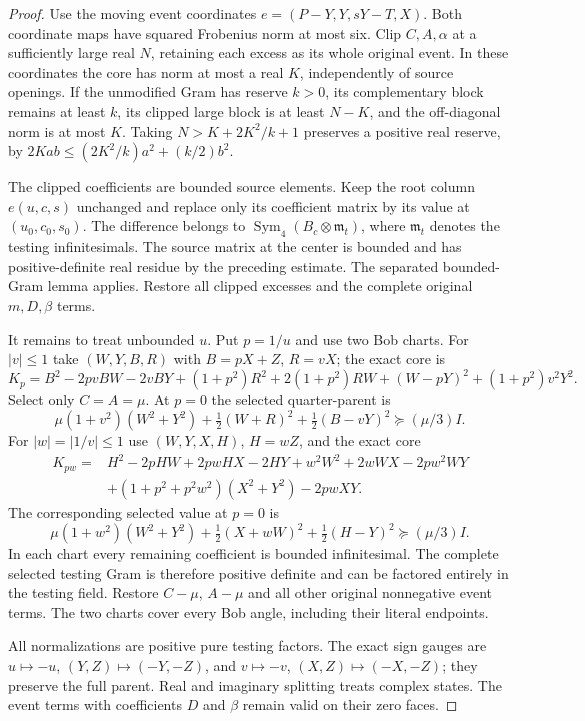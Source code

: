 \begin{proof}
Use the moving event coordinates $e=(P-Y,Y,sY-T,X)$.
Both coordinate maps have squared Frobenius norm at most six.
Clip $C,A,\alpha$ at a sufficiently large real $N$, retaining each
excess as its whole original event. In these coordinates the core
has norm at most a real $K$, independently of source openings.
If the unmodified Gram has reserve $k>0$, its complementary block
remains at least $k$, its clipped large block is at least $N-K$,
and the off-diagonal norm is at most $K$. Taking
$N>K+2K^2/k+1$ preserves a positive real reserve, by
$2Kab\le(2K^2/k)a^2+(k/2)b^2$.

The clipped coefficients are bounded source elements. Keep the root
column $e(u,c,s)$ unchanged and replace only its coefficient matrix
by its value at $(u_0,c_0,s_0)$. The difference belongs to
$\operatorname{Sym}_4(B_c\otimes\mathfrak m_t)$, where
$\mathfrak m_t$ denotes the testing infinitesimals. The source
matrix at the center is bounded and has positive-definite real
residue by the preceding estimate.
The separated bounded-Gram lemma applies. Restore all clipped
excesses and the complete original $m,D,\beta$ terms.

It remains to treat unbounded $u$. Put $p=1/u$ and use two Bob charts.
For $|v|\le1$ take $(W,Y,B,R)$ with $B=pX+Z$, $R=vX$; the exact core is
\[
 K_p=B^2-2pvBW-2vBY+(1+p^2)R^2+2(1+p^2)RW
                         +(W-pY)^2+(1+p^2)v^2Y^2.
\]
Select only $C=A=\mu$. At $p=0$ the selected quarter-parent is
\[
 \mu(1+v^2)(W^2+Y^2)+\tfrac12(W+R)^2
                             +\tfrac12(B-vY)^2\succeq(\mu/3)I.
\]
For $|w|=|1/v|\le1$ use $(W,Y,X,H)$, $H=wZ$, and the exact core
\begin{align*}
 K_{pw}={}&H^2-2pHW+2pwHX-2HY+w^2W^2+2wWX-2pw^2WY\\
 &+(1+p^2+p^2w^2)(X^2+Y^2)-2pwXY.
\end{align*}
The corresponding selected value at $p=0$ is
\[
 \mu(1+w^2)(W^2+Y^2)+\tfrac12(X+wW)^2
                               +\tfrac12(H-Y)^2\succeq(\mu/3)I.
\]
In each chart every remaining coefficient is bounded infinitesimal.
The complete selected testing Gram is therefore positive definite
and can be factored entirely in the testing field. Restore $C-\mu$,
$A-\mu$ and all other original nonnegative event terms. The two
charts cover every Bob angle, including their literal endpoints.

All normalizations are positive pure testing factors. The exact
sign gauges are $u\mapsto-u$, $(Y,Z)\mapsto(-Y,-Z)$, and
$v\mapsto-v$, $(X,Z)\mapsto(-X,-Z)$; they preserve the full parent.
Real and imaginary splitting treats complex states. The event terms with coefficients $D$ and $\beta$ remain valid
on their zero faces.
\end{proof}
